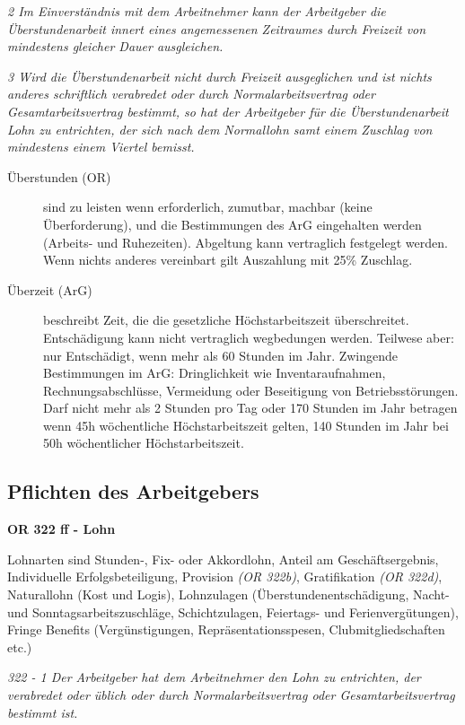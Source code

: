 \textit{2 Im Einverständnis mit dem Arbeitnehmer kann der Arbeitgeber die Überstundenarbeit innert eines angemessenen Zeitraumes durch Freizeit von mindestens gleicher Dauer ausgleichen.}

\textit{3 Wird die Überstundenarbeit nicht durch Freizeit ausgeglichen und ist nichts anderes schriftlich verabredet oder durch Normalarbeitsvertrag oder Gesamtarbeitsvertrag bestimmt, so hat der Arbeitgeber für die Überstundenarbeit Lohn zu entrichten, der sich nach dem Normallohn samt einem Zuschlag von mindestens einem Viertel bemisst.}

\begin{description}
  \item[Überstunden (OR)] sind zu leisten wenn erforderlich, zumutbar, machbar (keine Überforderung), und die Bestimmungen des ArG eingehalten werden (Arbeits- und Ruhezeiten). Abgeltung kann vertraglich festgelegt werden. Wenn nichts anderes vereinbart gilt Auszahlung mit 25\% Zuschlag.
  \item[Überzeit (ArG)] beschreibt Zeit, die die gesetzliche Höchstarbeitszeit überschreitet. Entschädigung kann nicht vertraglich wegbedungen werden. Teilwese aber: nur Entschädigt, wenn mehr als 60 Stunden im Jahr. Zwingende Bestimmungen im ArG: Dringlichkeit wie Inventaraufnahmen, Rechnungsabschlüsse, Vermeidung oder Beseitigung von Betriebsstörungen. Darf nicht mehr als 2 Stunden pro Tag oder 170 Stunden im Jahr betragen wenn 45h wöchentliche Höchstarbeitszeit gelten, 140 Stunden im Jahr bei 50h wöchentlicher Höchstarbeitszeit. 
\end{description}

\subsection{Pflichten des Arbeitgebers}

\noindent
\textbf{OR 322 ff - Lohn}

Lohnarten sind Stunden-, Fix- oder Akkordlohn, Anteil am Geschäftsergebnis, Individuelle Erfolgsbeteiligung, Provision \textit{(OR 322b)}, Gratifikation \textit{(OR 322d)}, Naturallohn (Kost und Logis), Lohnzulagen (Überstundenentschädigung, Nacht- und Sonntagsarbeitszuschläge, Schichtzulagen, Feiertags- und Ferienvergütungen), Fringe Benefits (Vergünstigungen, Repräsentationsspesen, Clubmitgliedschaften etc.) 

\textit{322 - 1 Der Arbeitgeber hat dem Arbeitnehmer den Lohn zu entrichten, der verabredet oder üblich oder durch Normalarbeitsvertrag oder Gesamtarbeitsvertrag bestimmt ist.}

